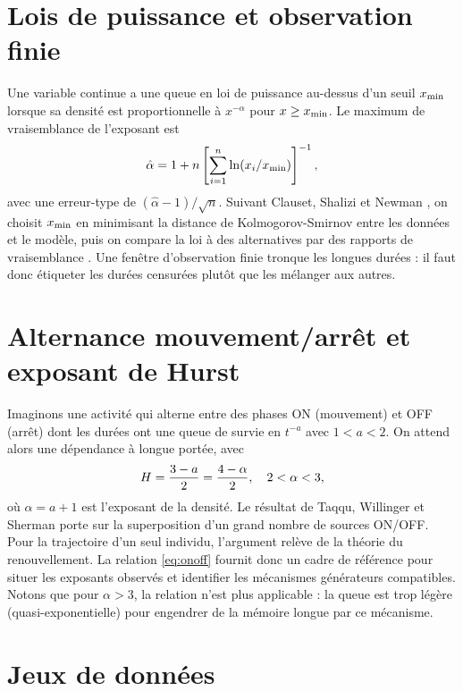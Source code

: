 \section{Lois de puissance et observation finie}
\label{sec:lois_puissance_theorie}
Une variable continue a une queue en loi de puissance au-dessus d'un seuil $x_{\min}$ lorsque sa densité est proportionnelle à $x^{-\alpha}$ pour $x \ge x_{\min}$. Le maximum de vraisemblance de l'exposant est
\begin{equation}
\hat{\alpha} = 1 + n \left[ \sum_{i=1}^{n} \ln(x_i/x_{\min}) \right]^{-1},
\end{equation}
avec une erreur-type de $(\hat{\alpha} - 1)/\sqrt{n}$. Suivant Clauset, Shalizi et Newman \cite{clauset2009}, on choisit $x_{\min}$ en minimisant la distance de Kolmogorov-Smirnov entre les données et le modèle, puis on compare la loi à des alternatives par des rapports de vraisemblance \cite{vuong1989}. Une fenêtre d'observation finie tronque les longues durées \cite{stouffer2005} : il faut donc étiqueter les durées censurées plutôt que les mélanger aux autres.

\section{Alternance mouvement/arrêt et exposant de Hurst}
\label{sec:onoff}
Imaginons une activité qui alterne entre des phases ON (mouvement) et OFF (arrêt) dont les durées ont une queue de survie en $t^{-a}$ avec $1 < a < 2$. On attend alors une dépendance à longue portée, avec
\begin{equation}
H = \frac{3-a}{2} = \frac{4-\alpha}{2}, \quad 2 < \alpha < 3,
\label{eq:onoff}
\end{equation}
où $\alpha = a + 1$ est l'exposant de la densité. Le résultat de Taqqu, Willinger et Sherman \cite{taqqu1997} porte sur la superposition d'un grand nombre de sources ON/OFF. Pour la trajectoire d'un seul individu, l'argument relève de la théorie du renouvellement. La relation \eqref{eq:onoff} fournit donc un cadre de référence pour situer les exposants observés et identifier les mécanismes générateurs compatibles. Notons que pour $\alpha > 3$, la relation n'est plus applicable : la queue est trop légère (quasi-exponentielle) pour engendrer de la mémoire longue par ce mécanisme.

\section{Jeux de données}
\label{sec:jeux_donnees}

